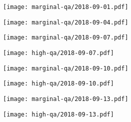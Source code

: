\documentclass{article}
\begin{document}
\begin{figure}[H]
	\ContinuedFloat
	\centering
	\begin{subfigure}{\linewidth}
		\texttt{[image: marginal-qa/2018-09-01.pdf]}
	\end{subfigure}
	\begin{subfigure}{\linewidth}
		\texttt{[image: marginal-qa/2018-09-04.pdf]}
	\end{subfigure}
	\begin{subfigure}{0.48\linewidth}
		\texttt{[image: marginal-qa/2018-09-07.pdf]}
	\end{subfigure}
	\begin{subfigure}{0.48\linewidth}
		\texttt{[image: high-qa/2018-09-07.pdf]}
	\end{subfigure}
	\begin{subfigure}{0.48\linewidth}
		\texttt{[image: marginal-qa/2018-09-10.pdf]}
	\end{subfigure}
	\begin{subfigure}{0.48\linewidth}
		\texttt{[image: high-qa/2018-09-10.pdf]}
	\end{subfigure}
	\begin{subfigure}{0.48\linewidth}
		\texttt{[image: marginal-qa/2018-09-13.pdf]}
	\end{subfigure}
	\begin{subfigure}{0.48\linewidth}
		\texttt{[image: high-qa/2018-09-13.pdf]}
	\end{subfigure}
\end{figure}
\end{document}
